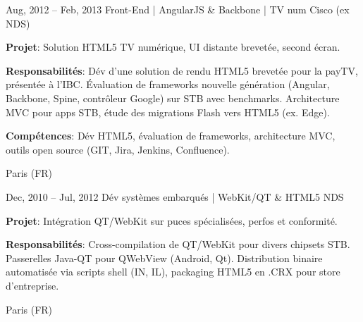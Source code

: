 \documentclass[
  a4paper,
   maincolor=cvblue,
   sectioncolor=cvblue,
   sidebarwidth=0.323\paperwidth,
]{fortysecondscv}
\begin{document}
\begin{cvtableNew}
  \cvitemRightNew
    {Aug, 2012 – Feb, 2013} %
    {Front-End | AngularJS \& Backbone | TV num} %
    {Cisco (ex NDS)} %
    {
      \vspace{1pt}
      \fontsize{10.8pt}{12pt}\selectfont %
      \textbf{Projet}: Solution HTML5 TV numérique, UI distante brevetée, second écran.\par
      \vspace{4pt}
      \textbf{Responsabilités}: Dév d’une solution de rendu HTML5 brevetée pour la payTV, présentée à l’IBC. Évaluation de frameworks nouvelle génération (Angular, Backbone, Spine, contrôleur Google) sur STB avec benchmarks. Architecture MVC pour apps STB, étude des migrations Flash vers HTML5 (ex. Edge).\par
      \vspace{4pt}
      \textbf{Compétences}: Dév HTML5, évaluation de frameworks, architecture MVC, outils open source (GIT, Jira, Jenkins, Confluence).\par
    }
    {Paris (FR)} %

    \vspace{1.57mm} %

  \cvitemRightNew
    {Dec, 2010 – Jul, 2012} %
    {Dév systèmes embarqués | WebKit/QT \& HTML5} %
    {NDS} %
    {
      \vspace{1pt}
      \fontsize{10.8pt}{12pt}\selectfont %
      \textbf{Projet}: Intégration QT/WebKit sur puces spécialisées, perfos et conformité.\par
      \vspace{4pt}
      \textbf{Responsabilités}: Cross-compilation de QT/WebKit pour divers chipsets STB. Passerelles Java-QT pour QWebView (Android, Qt). Distribution binaire automatisée via scripts shell (IN, IL), packaging HTML5 en .CRX pour store d’entreprise.\par
    }
    {Paris (FR)} %

    \vspace{1.57mm} %


\end{cvtableNew}
\end{document}
